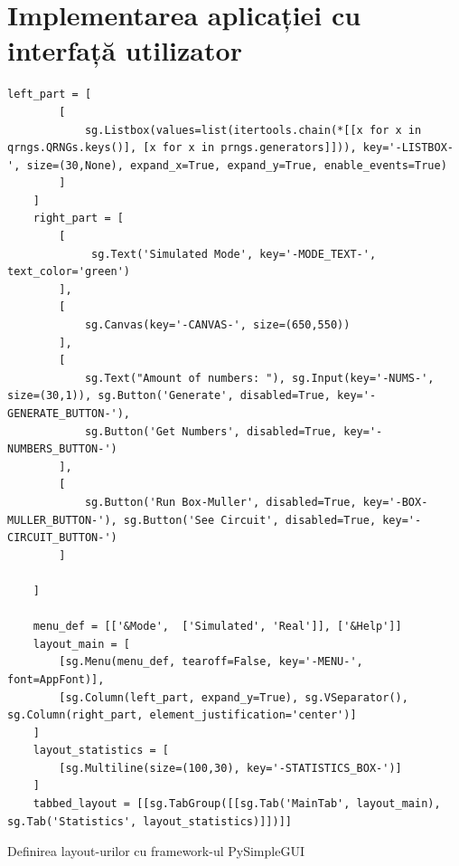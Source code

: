 \section{Implementarea aplicației cu interfață utilizator}
\label{anexa2:GUIApp}
\begin{code}
\begin{verbatim}
left_part = [
        [
            sg.Listbox(values=list(itertools.chain(*[[x for x in qrngs.QRNGs.keys()], [x for x in prngs.generators]])), key='-LISTBOX-', size=(30,None), expand_x=True, expand_y=True, enable_events=True)
        ]
    ]
    right_part = [
        [
             sg.Text('Simulated Mode', key='-MODE_TEXT-', text_color='green') 
        ],
        [
            sg.Canvas(key='-CANVAS-', size=(650,550))
        ],
        [
            sg.Text("Amount of numbers: "), sg.Input(key='-NUMS-', size=(30,1)), sg.Button('Generate', disabled=True, key='-GENERATE_BUTTON-'),
            sg.Button('Get Numbers', disabled=True, key='-NUMBERS_BUTTON-')
        ],
        [
            sg.Button('Run Box-Muller', disabled=True, key='-BOX-MULLER_BUTTON-'), sg.Button('See Circuit', disabled=True, key='-CIRCUIT_BUTTON-')
        ]
        
    ]

    menu_def = [['&Mode',  ['Simulated', 'Real']], ['&Help']]
    layout_main = [
        [sg.Menu(menu_def, tearoff=False, key='-MENU-', font=AppFont)],
        [sg.Column(left_part, expand_y=True), sg.VSeparator(), sg.Column(right_part, element_justification='center')]
    ]
    layout_statistics = [
        [sg.Multiline(size=(100,30), key='-STATISTICS_BOX-')]
    ]
    tabbed_layout = [[sg.TabGroup([[sg.Tab('MainTab', layout_main), sg.Tab('Statistics', layout_statistics)]])]]
\end{verbatim}
\caption{Definirea layout-urilor cu framework-ul PySimpleGUI}
\end{code}
\newpage
